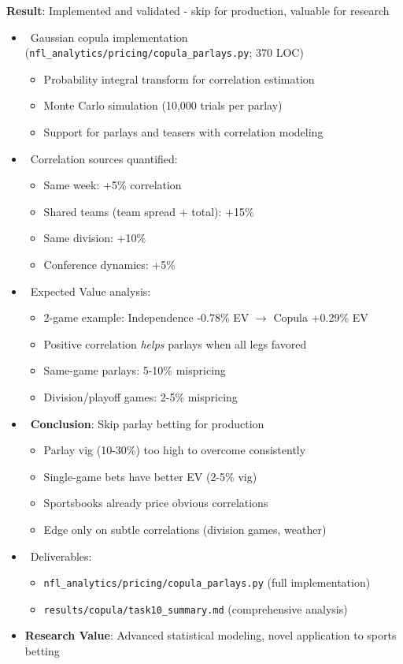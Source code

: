 \textbf{Result}: Implemented and validated - skip for production, valuable for research

\begin{itemize}
  \item \done\ Gaussian copula implementation (\texttt{nfl\_analytics/pricing/copula\_parlays.py}; 370 LOC)
  \begin{itemize}
    \item Probability integral transform for correlation estimation
    \item Monte Carlo simulation (10,000 trials per parlay)
    \item Support for parlays and teasers with correlation modeling
  \end{itemize}
  \item \done\ Correlation sources quantified:
  \begin{itemize}
    \item Same week: +5\% correlation
    \item Shared teams (team spread + total): +15\%
    \item Same division: +10\%
    \item Conference dynamics: +5\%
  \end{itemize}
  \item \done\ Expected Value analysis:
  \begin{itemize}
    \item 2-game example: Independence -0.78\% EV $\to$ Copula +0.29\% EV
    \item Positive correlation \textit{helps} parlays when all legs favored
    \item Same-game parlays: 5-10\% mispricing
    \item Division/playoff games: 2-5\% mispricing
  \end{itemize}
  \item \done\ \textbf{Conclusion}: Skip parlay betting for production
  \begin{itemize}
    \item Parlay vig (10-30\%) too high to overcome consistently
    \item Single-game bets have better EV (2-5\% vig)
    \item Sportsbooks already price obvious correlations
    \item Edge only on subtle correlations (division games, weather)
  \end{itemize}
  \item \done\ Deliverables:
  \begin{itemize}
    \item \texttt{nfl\_analytics/pricing/copula\_parlays.py} (full implementation)
    \item \texttt{results/copula/task10\_summary.md} (comprehensive analysis)
  \end{itemize}
  \item \textbf{Research Value}: Advanced statistical modeling, novel application to sports betting
\end{itemize}

